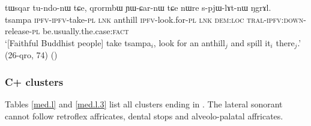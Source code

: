 \begin{exe}
	\ex \label{ex:spjWlAtnW}
	\gll tɯsqar tu-ndo-nɯ tɕe, qrormbɯ ɲɯ-ɕar-nɯ tɕe nɯre s-pjɯ-lɤt-nɯ ŋgrɤl. \\
	tsampa \textsc{ipfv}-\textsc{ipfv}-take-\textsc{pl} \textsc{lnk} anthill \textsc{ipfv}-look.for-\textsc{pl} \textsc{lnk} \textsc{dem}:\textsc{loc} \textsc{tral}-\textsc{ipfv}:\textsc{down}-release-\textsc{pl} be.usually.the.case:\textsc{fact} \\
	\glt `[Faithful Buddhist people] take tsampa$_i$, look for an anthill$_j$ and spill it$_i$ there$_j$.' (26-qro, 74)
()
\end{exe}

\subsubsection{C+ clusters} \label{sec:Cl.clusters}
Tables \ref{med.l} and \ref{med.l.3} list all clusters ending in . The lateral sonorant cannot follow retroflex affricates, dental stops and alveolo-palatal affricates.

